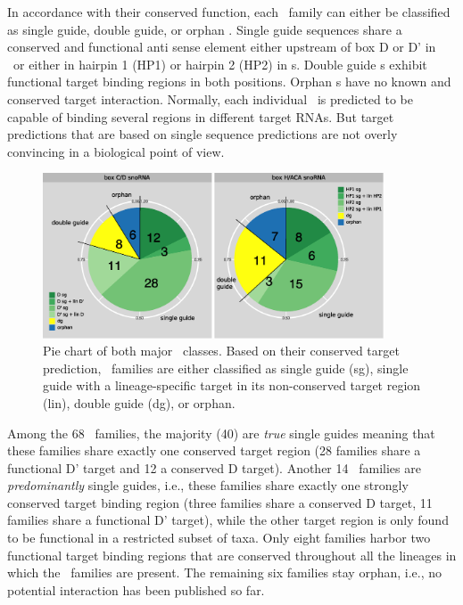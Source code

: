 In accordance with their conserved function, each \sno\ family can either
be classified as single guide, double guide, or orphan \sno. Single guide
sequences share a conserved and functional anti sense element either
upstream of box D or D' in \cd\ or either in hairpin 1 (HP1) or hairpin 2
(HP2) in \haca s. Double guide \sno s exhibit functional target binding
regions in both positions. Orphan \sno s have no known and conserved target
interaction. Normally, each individual \sno\ is predicted to be capable of
binding several regions in different target RNAs. But target predictions
that are based on single sequence predictions are not overly convincing in
a biological point of view.

\begin{figure}
  \centering
  \includegraphics[width=0.9\textwidth]{pics/pieCharts_snoRNAs_modified.eps}
  \caption[Classification of \sno\ families as single or double
  guides.]{Pie chart of both major \sno\ classes. Based on their conserved
    target prediction, \sno\ families are either classified as single guide
    (sg), single guide with a lineage-specific target in its non-conserved
    target region (lin), double guide (dg), or orphan.}
  \label{fig:pie_charts}
\end{figure}

Among the 68 \cd\ families, the majority (40) are \textit{true} single
guides meaning that these families share exactly one conserved target
region (28 families share a functional D' target and 12 a conserved D
target). Another 14 \cd\ families are \textit{predominantly} single guides,
i.e., these families share exactly one strongly conserved target binding
region (three families share a conserved D target, 11 families share a
functional D' target), while the other target region is only found to be
functional in a restricted subset of taxa. Only eight families harbor two
functional target binding regions that are conserved throughout all the
lineages in which the \sno\ families are present. The remaining six
families stay orphan, i.e., no potential interaction has been published so
far.

